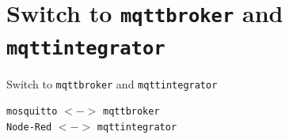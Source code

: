 ﻿\section{Switch to \texttt{mqttbroker} and \texttt{mqttintegrator}}

\begin{frame}[fragile]{Switch to \texttt{mqttbroker} and \texttt{mqttintegrator}}
  \begin{center}
    \Huge{\texttt{\textcolor{fh-ooe-red}{mosquitto}} $<->$ \texttt{\textcolor{fh-ooe-red}{mqttbroker}}}\\
    \vspace{1cm}
    \Huge{\texttt{\textcolor{fh-ooe-red}{Node-Red}} $<->$ \texttt{\textcolor{fh-ooe-red}{mqttintegrator}}}\\
  \end{center}
\end{frame}

